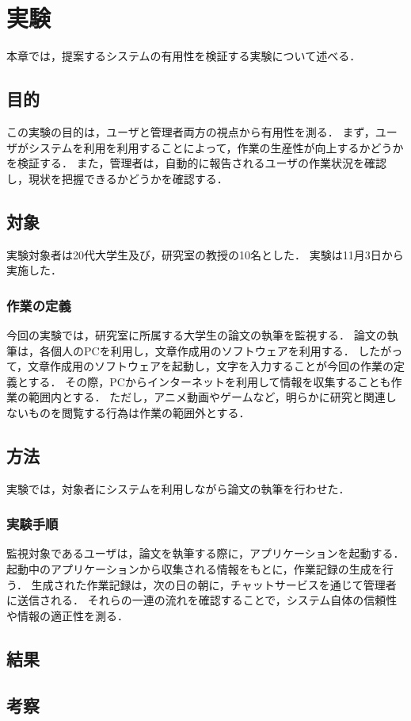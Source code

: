 \chapter{実験}
本章では，提案するシステムの有用性を検証する実験について述べる．

\section{目的}
この実験の目的は，ユーザと管理者両方の視点から有用性を測る．
まず，ユーザがシステムを利用を利用することによって，作業の生産性が向上するかどうかを検証する．
また，管理者は，自動的に報告されるユーザの作業状況を確認し，現状を把握できるかどうかを確認する．

\section{対象}
実験対象者は20代大学生及び，研究室の教授の10名とした．
実験は11月3日から実施した．

\subsection{作業の定義}
今回の実験では，研究室に所属する大学生の論文の執筆を監視する．
論文の執筆は，各個人のPCを利用し，文章作成用のソフトウェアを利用する．
したがって，文章作成用のソフトウェアを起動し，文字を入力することが今回の作業の定義とする．
その際，PCからインターネットを利用して情報を収集することも作業の範囲内とする．
ただし，アニメ動画やゲームなど，明らかに研究と関連しないものを閲覧する行為は作業の範囲外とする．

\section{方法}
実験では，対象者にシステムを利用しながら論文の執筆を行わせた．

\subsection{実験手順}
監視対象であるユーザは，論文を執筆する際に，アプリケーションを起動する．
起動中のアプリケーションから収集される情報をもとに，作業記録の生成を行う．
生成された作業記録は，次の日の朝に，チャットサービスを通じて管理者に送信される．
それらの一連の流れを確認することで，システム自体の信頼性や情報の適正性を測る．

\section{結果}

\section{考察}


